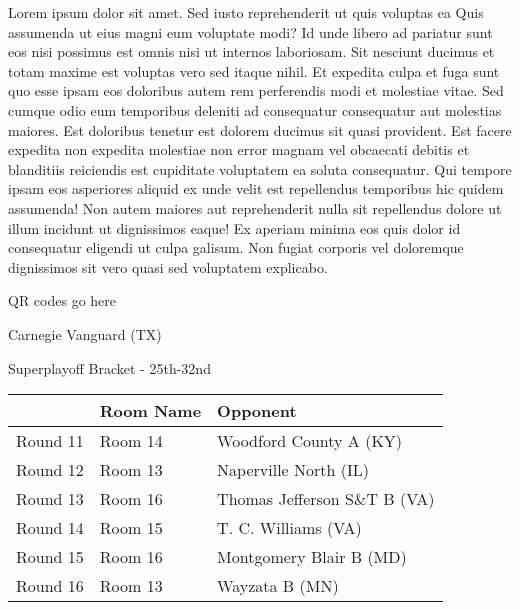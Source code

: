 \documentclass{article}%
\begin{document}
\vspace*{8pt}%
\linebreak%
\newline%
\newline%
    Lorem ipsum dolor sit amet. Sed iusto reprehenderit ut quis voluptas ea Quis assumenda ut eius magni eum voluptate modi? Id unde libero ad pariatur sunt eos nisi possimus est omnis nisi ut internos laboriosam. Sit nesciunt ducimus et totam maxime est voluptas vero sed itaque nihil. Et expedita culpa et fuga sunt quo esse ipsam eos doloribus autem rem perferendis modi et molestiae vitae.\newline%
\newline%
    Sed cumque odio eum temporibus deleniti ad consequatur consequatur aut molestias maiores. Est doloribus tenetur est dolorem ducimus sit quasi provident. Est facere expedita non expedita molestiae non error magnam vel obcaecati debitis et blanditiis reiciendis est cupiditate voluptatem ea soluta consequatur. Qui tempore ipsam eos asperiores aliquid ex unde velit est repellendus temporibus hic quidem assumenda!\newline%
\newline%
    Non autem maiores aut reprehenderit nulla sit repellendus dolore ut illum incidunt ut dignissimos eaque! Ex aperiam minima eos quis dolor id consequatur eligendi ut culpa galisum. Non fugiat corporis vel doloremque dignissimos sit vero quasi sed voluptatem explicabo.\newline%
\newline%
\vspace*{30pt}%
\begin{center}%
\begin{Huge}%
QR codes go here%
\end{Huge}%
\end{center}%
\newpage%
\begin{center}%
\begin{Huge}%
Carnegie Vanguard (TX)%
\end{Huge}%
\vspace*{8pt}%
\linebreak%
\begin{Large}%
Superplayoff Bracket {-} 25th{-}32nd%
\end{Large}%
\end{center}%
%
\begin{tabularx}{\textwidth}{|c|Y|Y|}%
\hline%
&Room Name&Opponent\\%
\hline%
Round 11&Room 14&Woodford County A (KY)\\%
Round 12&Room 13&Naperville North (IL)\\%
Round 13&Room 16&Thomas Jefferson S\&T B (VA)\\%
Round 14&Room 15&T. C. Williams (VA)\\%
Round 15&Room 16&Montgomery Blair B (MD)\\%
Round 16&Room 13&Wayzata B (MN)\\%
\hline%
\end{tabularx}%
\end{document}
